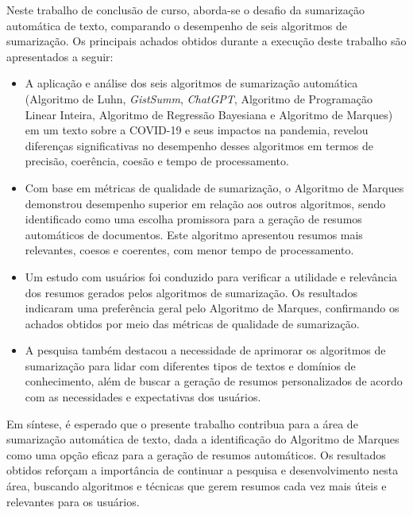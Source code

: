 Neste trabalho de conclusão de curso, aborda-se o desafio da sumarização automática de texto, comparando o desempenho de seis algoritmos de sumarização. Os principais achados obtidos durante a execução deste trabalho são apresentados a seguir:
\begin{itemize}
    \item A aplicação e análise dos seis algoritmos de sumarização automática (Algoritmo de Luhn, \textit{GistSumm}, \textit{ChatGPT}, Algoritmo de Programação Linear Inteira, Algoritmo de Regressão Bayesiana e Algoritmo de Marques) em um texto sobre a COVID-19 e seus impactos na pandemia, revelou diferenças significativas no desempenho desses algoritmos em termos de precisão, coerência, coesão e tempo de processamento.
    \item Com base em métricas de qualidade de sumarização, o Algoritmo de Marques demonstrou desempenho superior em relação aos outros algoritmos, sendo identificado como uma escolha promissora para a geração de resumos automáticos de documentos. Este algoritmo apresentou resumos mais relevantes, coesos e coerentes, com menor tempo de processamento.
    \item Um estudo com usuários foi conduzido para verificar a utilidade e relevância dos resumos gerados pelos algoritmos de sumarização. Os resultados indicaram uma preferência geral pelo Algoritmo de Marques, confirmando os achados obtidos por meio das métricas de qualidade de sumarização.
    \item A pesquisa também destacou a necessidade de aprimorar os algoritmos de sumarização para lidar com diferentes tipos de textos e domínios de conhecimento, além de buscar a geração de resumos personalizados de acordo com as necessidades e expectativas dos usuários.
\end{itemize}

Em síntese, é esperado que o presente trabalho contribua para a área de sumarização automática de texto, dada a identificação do Algoritmo de Marques como uma opção eficaz para a geração de resumos automáticos. Os resultados obtidos reforçam a importância de continuar a pesquisa e desenvolvimento nesta área, buscando algoritmos e técnicas que gerem resumos cada vez mais úteis e relevantes para os usuários.